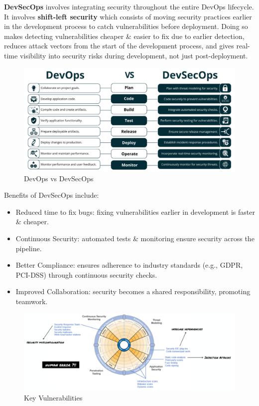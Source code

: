 \documentclass[a4paper,11pt]{article}
\begin{document}
\textbf{DevSecOps} involves integrating security throughout the entire DevOps lifecycle.
It involves \textbf{shift-left security} which consists of moving security practices earlier in the development
process to catch vulnerabilities before deployment.
Doing so makes detecting vulnerabilities cheaper \& easier to fix due to earlier detection, reduces attack vectors from the start of the development process, and gives real-time visibility into security risks during development, not just post-deployment.

\begin{figure}[H]
    \centering
    \includegraphics[width=\textwidth]{images/tradsec_vs_devsecops.png}
    \caption{DevOps vs DevSecOps}
\end{figure}

Benefits of DevSecOps include:
\begin{itemize}
    \item   Reduced time to fix bugs: fixing vulnerabilities earlier in development is faster \& cheaper.
    \item   Continuous Security: automated tests \& monitoring ensure security across the pipeline.
    \item   Better Compliance: ensures adherence to industry standards (e.g., GDPR, PCI-DSS) through continuous security checks.
    \item   Improved Collaboration: security becomes a shared responsibility, promoting teamwork.
\end{itemize}

\begin{figure}[H]
    \centering
    \includegraphics[width=\textwidth]{images/devsecopskeyvulns.png}
    \caption{Key Vulnerabilities}
\end{figure}
\end{document}
